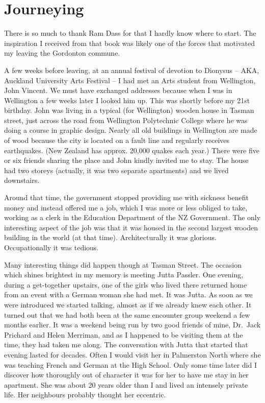 \chapter{Journeying}

There is so much to thank Ram Dass for that I hardly know where to
start. The inspiration I received from that book was likely one of the
forces that motivated my leaving the Gordonton commune.

A few weeks before leaving, at an annual festival of devotion to
Dionysus -- AKA, Auckland University Arts Festival -- I had met an Arts
student from Wellington, John Vincent. We must have exchanged addresses
because when I was in Wellington a few weeks later I looked him up. This
was shortly before my 21st birthday. John was living in a typical (for
Wellington) wooden house in Tasman street, just across the road from
Wellington Polytechnic College where he was doing a course in graphic
design. Nearly all old buildings in Wellington are made of wood because
the city is located on a fault line and regularly receives earthquakes.
(New Zealand has approx. 20,000 quakes\cite{quakes} each year.)
There were five or six friends sharing the place and John kindly invited
me to stay. The house had two storeys (actually, it was two separate
apartments) and we lived downstairs.

Around that time, the government stopped providing me with sickness
benefit money and instead offered me a job, which I was more or less
obliged to take, working as a clerk in the Education Department of the
NZ Government. The only interesting aspect of the job was that it was
housed in the second largest wooden building\cite{building} in the world (at that time).
Architecturally it was glorious. Occupationally it was tedious.

Many interesting things did happen though at Tasman Street. The occasion
which shines brightest in my memory is meeting Jutta Passler. One
evening, during a get-together upstairs, one of the girls who lived
there returned home from an event with a German woman she had met. It
was Jutta. As soon as we were introduced we started talking, almost as
if we already knew each other. It turned out that we had both been at
the same encounter group weekend a few months earlier. It was a weekend
being run by two good friends of mine, Dr.~Jack Prichard and Helen
Merriman, and as I happened to be visiting them at the time, they had
taken me along. The conversation with Jutta that started that evening
lasted for decades. Often I would visit her in Palmerston North where
she was teaching French and German at the High School. Only some time
later did I discover how thoroughly out of character it was for her to
have me stay in her apartment. She was about 20 years older than I and
lived an intensely private life. Her neighbours probably thought her
eccentric.

